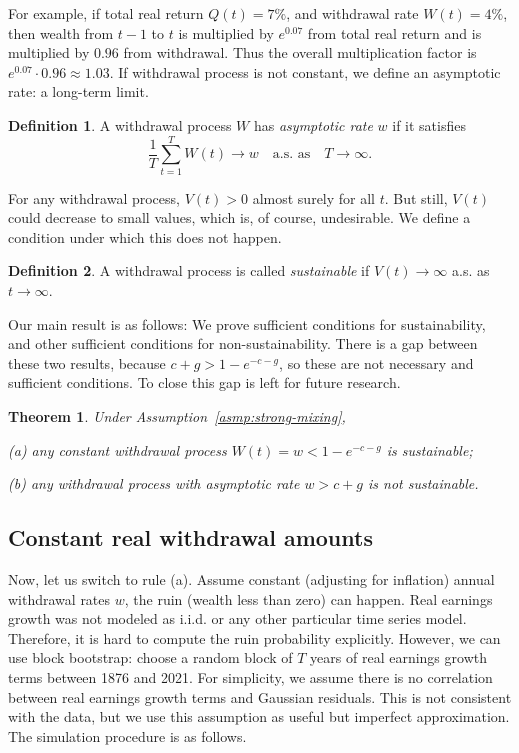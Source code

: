 \documentclass[12pt]{amsart}
\newtheorem{theorem}{Theorem}
\theoremstyle{definition}
\newtheorem{definition}{Definition}
\begin{document}
For example, if total real return $Q(t) = 7\%$, and withdrawal rate $W(t) = 4\%$, then wealth from $t-1$ to $t$ is multiplied by $e^{0.07}$ from total real return and is multiplied by $0.96$ from withdrawal. Thus the overall multiplication factor is $e^{0.07}\cdot 0.96 \approx 1.03$. If withdrawal process is not constant, we define an asymptotic rate: a long-term limit.

\begin{definition} A withdrawal process $W$ has {\it asymptotic rate} $w$ if it satisfies
$$
\frac1T\sum\limits_{t=1}^TW(t) \to w\quad \mbox{a.s. as}\quad T \to \infty.
$$
\end{definition}

For any withdrawal process, $V(t) > 0$ almost surely for all $t$. But still, $V(t)$ could decrease to small values, which is, of course, undesirable. We define a condition under which this does not happen. 

\begin{definition}
A withdrawal process is called {\it sustainable} if $V(t) \to \infty$ a.s. as $t \to \infty$. 
\end{definition}

Our main result is as follows: We prove sufficient conditions for sustainability, and other sufficient conditions for non-sustainability. There is a gap between these two results, because $c + g > 1 - e^{-c-g}$, so these are not necessary and sufficient conditions. To close this gap is left for future research. 

\begin{theorem} Under  Assumption~\ref{asmp:strong-mixing}, 

(a) any constant withdrawal process $W(t) = w < 1 - e^{-c-g}$ is sustainable;

(b) any withdrawal process with asymptotic rate $w > c + g$ is not sustainable.
\label{thm:withdrawal}
\end{theorem}


\subsection{Constant real withdrawal amounts} Now, let us switch to rule (a). Assume constant (adjusting for inflation) annual withdrawal rates $w$, the ruin (wealth less than zero) can happen. Real earnings growth was not modeled as i.i.d. or any other particular time series model. Therefore, it is hard to compute the ruin probability explicitly. However, we can use block bootstrap: choose a random block of $T$ years of real earnings growth terms between 1876 and 2021. For simplicity, we assume there is no correlation between real earnings growth terms and Gaussian residuals. This is not consistent with the data, but we use this assumption as useful but imperfect approximation. The simulation procedure is as follows.
\end{document}
